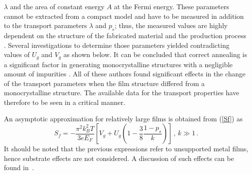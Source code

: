 \documentclass[journal]{IEEEtran}
\newcommand{\mathrmm}[1]{{#1}}
\begin{document}
$\lambda$ and the area of constant energy $A$ at the Fermi energy. These parameters cannot be extracted from a compact model and have to be measured in addition to the transport parameters $\lambda$ and $p_s$; thus, the measured values are highly dependent on the structure of the fabricated material and the production process \cite{sambles1983resistivity}. Several investigations to determine those parameters yielded contradicting values of $U_{\mathrmm{g}}$ and $V_{\mathrmm{g}}$ as shown below. It can be concluded that correct annealing is a significant factor in generating monocrystalline structures with a negligible amount of impurities \cite{leonard1973thermoelectric,suri1975electron,rao1976electrical,yu1973thermoelectric,rao1977size,lin1971thermoelectric,hubin1974resistivity}. All of these authors
found significant effects in the change of the transport parameters when the
film structure differed from a monocrystalline structure. The available data for the transport properties have therefore to be seen in a critical manner.

An asymptotic approximation for relatively large films is obtained from (\ref{Sf}) as
\cite{tellier1982size}
\begin{equation}
S_{\mathrmm{f}}=-\frac{\pi^{2}k_{\mathrmm{B}}^2T}{3eE_{\mathrmm{F}}}\left[
V_{\mathrmm{g}}+U_{\mathrmm{g}}\left(  1-\frac{3}{8}\frac{1-p_s}{k}\right)
\right] \,  , \, k\gg1 \, . \label{k>>1}%
\end{equation}
It should be noted that the previous expressions refer to unsupported metal
films, hence substrate effects are not considered. A discussion of such effects can be found in~\cite{pichard_thermoelectric_1982}.
\end{document}
